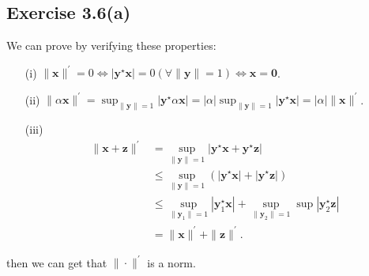 \documentclass{article}
\begin{document}
\subsection{Exercise 3.6(a)} 
    We can prove by verifying these properties:
        \begin{enumerate}
            \item[(i)] $ \|\bm{x}\|^{\prime} = 0 \Leftrightarrow | \bm{y}^{\star} \bm{x} | = 0 ( \forall \| \bm{y} \| = 1) \Leftrightarrow \bm{x} = \bm{0}$.
            \item[(ii)] $ \| \alpha \bm{x} \|^{\prime} = \sup_{\| \bm{y} \| = 1} | \bm{y}^{\star} \alpha \bm{x} | = |\alpha| \sup_{\| \bm{y} \|  = 1}  |\bm{y}^{\star}  \bm{x} |  = |\alpha| \| \bm{x}\|^{\prime}$.
            \item[(iii)] {
                $$
                \begin{aligned}
                    \| \bm{x + z}\|^{\prime} & = \sup_{\| \bm{y} \| = 1} | \bm{y}^{\star} \bm{x} + \bm{y}^{\star} \bm{z}| \\ 
                                            & \leq \sup_{\| \bm{y} \| = 1} ( |\bm{y}^{\star} \bm{x} | + | \bm{y}^{\star} \bm{z} |) \\
                                            & \leq \sup_{\| \bm{y}_1 \| = 1} | \bm{y}_1^\star \bm{x} | + \sup_{\| \bm{y}_2\| = 1} \sup | \bm{y}_2^{\star} \bm{z} | \\
                                            & = \| \bm{x}\|^{\prime} + \| \bm{z}\|^\prime.
                \end{aligned}
                $$
            }
        \end{enumerate}
        then we can get that $\| \cdot \|^\prime$ is a norm.
\end{document}
